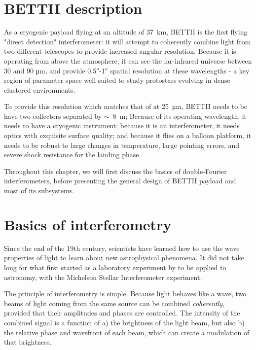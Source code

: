\section{BETTII description}

As a cryogenic payload flying at an altitude of \SI{37}{\kilo\meter}, BETTII is the first flying "direct detection" interferometer: it will attempt to coherently combine light from two different telescopes to provide increased angular resolution. Because it is operating from above the atmosphere, it can see the far-infrared universe between 30 and 90 \si{\micro\meter}, and provide \ang{;;0.5}-\ang{;;1} spatial resolution at these wavelengths - a key region of parameter space well-suited to study protostars evolving in dense clustered environments.

To provide this resolution which matches that of \JWST  at \SI{25}{\micro\meter}, BETTII needs to be have two collectors separated by $\sim$~\SI{8}{\meter}; Because of its operating wavelength, it needs to have a cryogenic instrument; because it is an interferometer, it needs optics with exquisite surface quality; and because it flies on a balloon platform, it needs to be robust to large changes in temperature, large pointing errors, and severe shock resistance for the landing phase.

Throughout this chapter, we will first discuss the basics of double-Fourier interferometers, before presenting the general design of BETTII payload and most of its subsystems.


\section{Basics of interferometry}

Since the end of the 19th century, scientists have learned how to use the wave properties of light to learn about new astrophysical phenomena. It did not take long for what first started as a laboratory experiment by \citet{Michelson:1887wc} to be applied to astronomy, with the Michelson Stellar Interferometer experiment. 

The principle of interferometry is simple. Because light behaves like a wave, two beams of light coming from the same source can be combined \textit{coherently}, provided that their amplitudes and phases are controlled. The intensity of the combined signal is a function of a) the brightness of the light beam, but also b) the relative phase and wavefront of each beam, which can create a modulation of that brightness.

